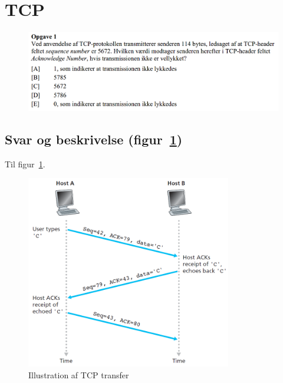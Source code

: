 \section{TCP}

\begin{figure}[H]
	\centering
	\includegraphics[width=\linewidth]{figs/tcp/SE15OP1}
	\caption{}
	\label{fig:SE15OP1}
\end{figure}

\subsection{Svar og beskrivelse (figur~\ref{fig:SE15OP1})}

Til figur~\ref{fig:SE15OP1}.
\derp

\begin{figure}[H]
	\centering
	\includegraphics[width=0.8\textwidth]{figs/tcp/tcptransfer}
	\caption{Illustration af TCP transfer}
	\label{fig:TCPtransfer}
\end{figure}

